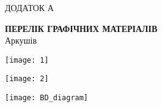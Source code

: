 \documentclass[main.tex]{subfiles}
\begin{document}
\renewcommand\stamppartname{Перелік графічних матеріалів}

\begin{specialpage}
  \MakeUppercase{Додаток А}\\
  \MakeUppercase{\stampname{}}

  \vspace*{\fill}
  \textbf{\MakeUppercase{\stamppartname{}}}\\
  Аркушів \pageref{\lastpagelabel{}}

  \vspace*{\fill}
  \mypagefooter{}
\end{specialpage}

\pagestyle{plain}

\renewcommand\stamppartname{Діаграма варіантів використання}
\begin{center}
\noindent\texttt{[image: 1]}
\end{center}
\newpage

\renewcommand\stampcode{ІАЛЦ.467100.005 Д2}
\renewcommand\stamppartname{Схема програми}
\begin{center}
\noindent\texttt{[image: 2]}
\end{center}
%
\newpage
\renewcommand\stampcode{ІАЛЦ.467100.006 Д3}
\renewcommand\stamppartname{Схема даних}
\begin{center}
\noindent\texttt{[image: BD\_diagram]}
\end{center}

\finalizepart{}
\end{document}
